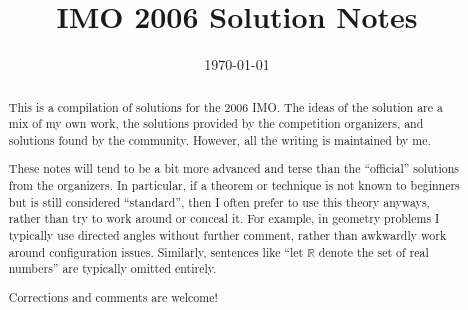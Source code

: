 \documentclass[11pt]{scrartcl}
\title{IMO 2006 Solution Notes}
\date{\today}
\begin{document}
\maketitle

\begin{abstract}
This is a compilation of solutions
for the 2006 IMO.
The ideas of the solution are a mix of my own work,
the solutions provided by the competition organizers,
and solutions found by the community.
However, all the writing is maintained by me.

These notes will tend to be a bit more advanced and terse than the ``official''
solutions from the organizers.
In particular, if a theorem or technique is not known to beginners
but is still considered ``standard'', then I often prefer to
use this theory anyways, rather than try to work around or conceal it.
For example, in geometry problems I typically use directed angles
without further comment, rather than awkwardly work around configuration issues.
Similarly, sentences like ``let $\mathbb{R}$ denote the set of real numbers''
are typically omitted entirely.

Corrections and comments are welcome!
\end{abstract}

\tableofcontents
\newpage

\addtocounter{section}{-1}
\end{document}
